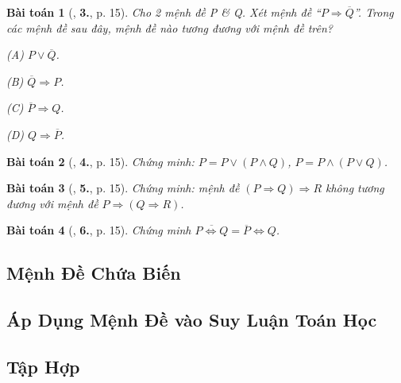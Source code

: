 \documentclass{article}
\numberwithin{equation}{section}
\newtheorem{baitoan}{Bài toán}[section]
\begin{document}
\begin{baitoan}[\cite{TL_chuyen_Toan_Dai_So_10}, \textbf{3.}, p. 15]
	Cho 2 mệnh đề P \& Q. Xét mệnh đề ``$P\Rightarrow\overline{Q}$''. Trong các mệnh đề sau đây, mệnh đề nào tương đương với mệnh đề trên?
	\begin{enumerate*}
		\item[(A)] $P\lor\overline{Q}$.
		\item[(B)] $\overline{Q}\Rightarrow P$.
		\item[(C)] $\overline{P}\Rightarrow Q$.
		\item[(D)] $Q\Rightarrow\overline{P}$.
	\end{enumerate*}
\end{baitoan}

\begin{baitoan}[\cite{TL_chuyen_Toan_Dai_So_10}, \textbf{4.}, p. 15]
	Chứng minh: $P = P\lor(P\land Q)$, $P = P\land(P\lor Q)$.
\end{baitoan}

\begin{baitoan}[\cite{TL_chuyen_Toan_Dai_So_10}, \textbf{5.}, p. 15]
	Chứng minh: mệnh đề $(P\Rightarrow Q)\Rightarrow R$ không tương đương với mệnh đề $P\Rightarrow(Q\Rightarrow R)$.
\end{baitoan}

\begin{baitoan}[\cite{TL_chuyen_Toan_Dai_So_10}, \textbf{6.}, p. 15]
	Chứng minh $\overline{P\Leftrightarrow Q} = \overline{P}\Leftrightarrow Q$.
\end{baitoan}


\subsection{Mệnh Đề Chứa Biến}


\subsection{Áp Dụng Mệnh Đề vào Suy Luận Toán Học}


\subsection{Tập Hợp}
\end{document}
